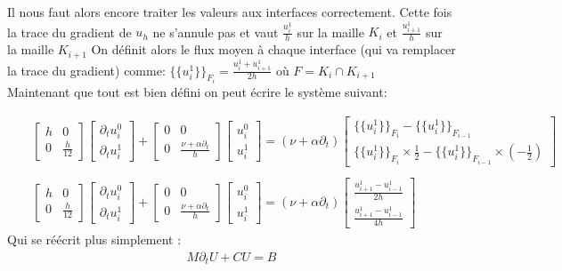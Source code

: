 Il nous faut alors encore traiter les valeurs aux interfaces correctement. Cette fois la trace du gradient de $u_h$ ne s'annule pas et vaut $\frac{u_i^1}{h}$ sur la maille $K_i$ et  $\frac{u_{i+1}^1}{h}$ sur la maille $K_{i+1}$
On définit alors le flux moyen à chaque interface (qui va remplacer la trace du gradient) comme: $\{\!\!\{ u_i^1 \}\!\!\}_{F_i} = \frac{u_{i}^{1} + u_{i+1}^{1}}{2h}$ où $F = K_i \cap K_{i+1}$ \\
Maintenant que tout est bien défini on peut écrire le système suivant:

\begin{eqnarray*}
    &&\begin{bmatrix}
        h & 0 \\
        0 & \frac{h}{12} 
    \end{bmatrix}
    \begin{bmatrix}
    \partial_t u_i^0 \\
    \partial_t u_i^1    
    \end{bmatrix}
    +
        \begin{bmatrix}
        0 & 0 \\
        0 & \frac{\nu + \alpha \partial_t}{h} 
    \end{bmatrix}
    \begin{bmatrix}
    u_i^0 \\
    u_i^1    
    \end{bmatrix}
    = (\nu + \alpha\partial_t)
    \begin{bmatrix}
    \{\!\!\{ u_i^1 \}\!\!\}_{F_i} - \{\!\!\{ u_i^1 \}\!\!\}_{F_{i-1}}\\
    \{\!\!\{ u_i^1 \}\!\!\}_{F_i} \times\frac{1}{2} - \{\!\!\{ u_i^1 \}\!\!\}_{F_{i-1}} \times (- \frac{1}{2})
    \end{bmatrix} \\
    \\
    &&\begin{bmatrix}
        h & 0 \\
        0 & \frac{h}{12} 
    \end{bmatrix}
    \begin{bmatrix}
    \partial_t u_i^0 \\
    \partial_t u_i^1    
    \end{bmatrix}
    +
        \begin{bmatrix}
        0 & 0 \\
        0 & \frac{\nu + \alpha \partial_t}{h} 
    \end{bmatrix}
    \begin{bmatrix}
    u_i^0 \\
    u_i^1    
    \end{bmatrix}
    = (\nu + \alpha\partial_t)
    \begin{bmatrix}
    \frac{u_{i+1}^1 - u_{i-1}^1 }{2h}\\
    \frac{u_{i+1}^1 - u_{i-1}^1 }{4h}
    \end{bmatrix}
\end{eqnarray*}
Qui se réécrit plus simplement :
\begin{eqnarray*}
    M \partial_t U + C U = B
\end{eqnarray*}

